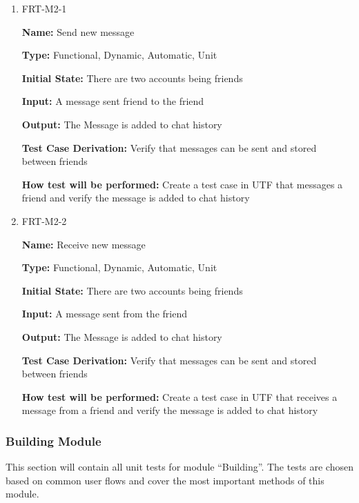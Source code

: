 \documentclass[12pt, titlepage]{article}
\begin{document}
\begin{enumerate}
\item{FRT-M2-1}

\textbf{Name:} Send new message

\textbf{Type:} Functional, Dynamic, Automatic, Unit
					
\textbf{Initial State:} There are two accounts being friends
					
\textbf{Input:} A message sent friend to the friend
					
\textbf{Output:} The Message is added to chat history

\textbf{Test Case Derivation:} Verify that messages can be sent and stored between friends

\textbf{How test will be performed:} Create a test case in UTF that messages a friend and verify the message is added to chat history

\item{FRT-M2-2}

\textbf{Name:} Receive new message

\textbf{Type:} Functional, Dynamic, Automatic, Unit
					
\textbf{Initial State:} There are two accounts being friends
					
\textbf{Input:} A message sent from the friend
					
\textbf{Output:} The Message is added to chat history

\textbf{Test Case Derivation:} Verify that messages can be sent and stored between friends

\textbf{How test will be performed:} Create a test case in UTF that receives a message from a friend and verify the message is added to chat history
\end{enumerate}

\subsubsection{Building Module}

This section will contain all unit tests for module ``Building''. The tests are chosen based on common user flows and cover the most important methods of this module.
\end{document}
